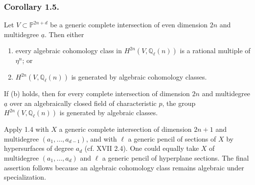 \subsubsection*{Corollary 1.5.}
Let $V\subset\mathbb P^{2n+d}$ be a generic complete intersection of even
dimension $2n$ and multidegree $\underline a$.  Then either
\begin{enumerate}[label=(\alph*)]
\item every algebraic cohomology class in
  $H^{2n}(V,\mathbb Q_\ell(n))$ is a rational multiple of $\eta^n$; or
\item $H^{2n}(V,\mathbb Q_\ell(n))$ is generated by algebraic cohomology
  classes.
\end{enumerate}
If (b) holds, then for every complete intersection of dimension $2n$ and
multidegree $\underline a$ over an algebraically closed field of
characteristic $p$, the group $H^{2n}(V,\mathbb Q_\ell(n))$ is generated by
algebraic classes.

Apply 1.4 with $X$ a generic complete intersection of dimension $2n+1$ and
multidegree $(a_1,\ldots,a_{d-1})$, and with $\ell$ a generic pencil of
sections of $X$ by hypersurfaces of degree $a_d$ (cf. XVII 2.4).  One could
equally take $X$ of multidegree $(a_1,\ldots,a_d)$ and $\ell$ a generic
pencil of hyperplane sections.  The final assertion follows because an
algebraic cohomology class remains algebraic under specialization.

